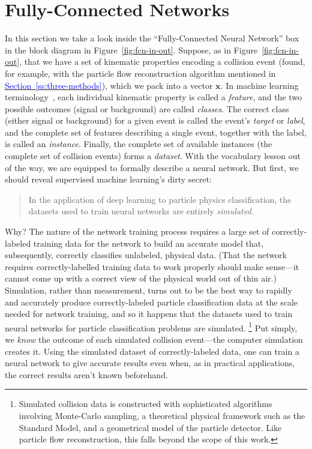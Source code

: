 \documentclass[11pt, a4paper]{article}
\newcommand{\myhref}[2]{\hyperref[#1]{\textcolor{blue}{#2}}}
\renewcommand{\vec}[1]{\bm{#1}}
\begin{document}
\section{Fully-Connected Networks} \label{s:fcn}
In this section we take a look inside the ``Fully-Connected Neural Network'' box in the block diagram in Figure~\ref{fig:fcn-in-out}.
Suppose, as in Figure~\ref{fig:fcn-in-out}, that we have a set of kinematic properties encoding a collision event (found, for example, with the particle flow reconstruction algorithm mentioned in \myhref{ss:three-methods}{Section~\ref{ss:three-methods}}), which we pack into a vector $ \vec{x} $.
In machine learning terminology~\cite{homl}, each individual kinematic property is called a \textit{feature}, and the two possible outcomes (signal or background) are called \textit{classes}.
The correct class (either signal or background) for a given event is called the event's \textit{target} or \textit{label}, and the complete set of features describing a single event, together with the label, is called an \textit{instance}.
Finally, the complete set of available instances (the complete set of collision events) forms a \textit{dataset}.
With the vocabulary lesson out of the way, we are equipped to formally describe a neural network.
But first, we should reveal supervised machine learning's dirty secret:
\begin{quote}
    In the application of deep learning to particle physics classification, the datasets used to train neural networks are entirely \textit{simulated}.
\end{quote}
Why? The nature of the network training process requires a large set of correctly-labeled training data for the network to build an accurate model that, subsequently, correctly classifies unlabeled, physical data.
(That the network requires correctly-labelled training data to work properly should make sense---it cannot come up with a correct view of the physical world out of thin air.)
Simulation, rather than measurement, turns out to be the best way to rapidly and accurately produce correctly-labeled particle classification data at the scale needed for network training, and so it happens that the datasets used to train neural networks for particle classification problems are simulated.%
\footnote{Simulated collision data is constructed with sophisticated algorithms involving Monte-Carlo sampling, a theoretical physical framework such as the Standard Model, and a geometrical model of the particle detector.
    Like particle flow reconstruction, this falls beyond the scope of this work.}
Put simply, we \textit{know} the outcome of each simulated collision event---the computer simulation creates it.
Using the simulated dataset of correctly-labeled data, one can train a neural network to give accurate results even when, as in practical applications, the correct results aren't known beforehand.
\end{document}
